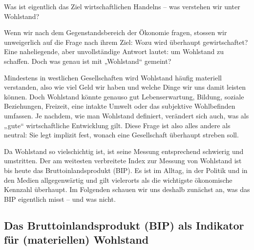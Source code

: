 \documentclass[
  nswissgerman,
  a4paper,
  DIV=11,
  numbers=noendperiod,
  oneside,
  openany]{scrreprt}
\begin{document}
\begin{tcolorbox}[enhanced jigsaw, arc=.35mm, bottomrule=.15mm, bottomtitle=1mm, breakable, colback=white, colbacktitle=quarto-callout-note-color!10!white, colframe=quarto-callout-note-color-frame, coltitle=black, left=2mm, leftrule=.75mm, opacityback=0, opacitybacktitle=0.6, rightrule=.15mm, title={Leitfrage}, titlerule=0mm, toprule=.15mm, toptitle=1mm]

Was ist eigentlich das Ziel wirtschaftlichen Handelns -- was verstehen
wir unter Wohlstand?

\end{tcolorbox}

Wenn wir nach dem Gegenstandsbereich der Ökonomie fragen, stossen wir
unweigerlich auf die Frage nach ihrem Ziel: Wozu wird überhaupt
gewirtschaftet? Eine naheliegende, aber unvollständige Antwort lautet:
um Wohlstand zu schaffen. Doch was genau ist mit „Wohlstand`` gemeint?

Mindestens in westlichen Gesellschaften wird Wohlstand häufig materiell
verstanden, also wie viel Geld wir haben und welche Dinge wir uns damit
leisten können. Doch Wohlstand könnte genauso gut Lebenserwartung,
Bildung, soziale Beziehungen, Freizeit, eine intakte Umwelt oder das
subjektive Wohlbefinden umfassen. Je nachdem, wie man Wohlstand
definiert, verändert sich auch, was als „gute`` wirtschaftliche
Entwicklung gilt. Diese Frage ist also alles andere als neutral: Sie
legt implizit fest, wonach eine Gesellschaft überhaupt streben soll.

Da Wohlstand so vielschichtig ist, ist seine Messung entsprechend
schwierig und umstritten. Der am weitesten verbreitete Index zur Messung
von Wohlstand ist bis heute das Bruttoinlandsprodukt (BIP). Es ist im
Alltag, in der Politik und in den Medien allgegenwärtig und gilt
vielerorts als die wichtigste ökonomische Kennzahl überhaupt. Im
Folgenden schauen wir uns deshalb zunächst an, was das BIP eigentlich
misst -- und was nicht.

\subsection{Das Bruttoinlandsprodukt (BIP) als Indikator für
(materiellen)
Wohlstand}\label{das-bruttoinlandsprodukt-bip-als-indikator-fuxfcr-materiellen-wohlstand}
\end{document}
